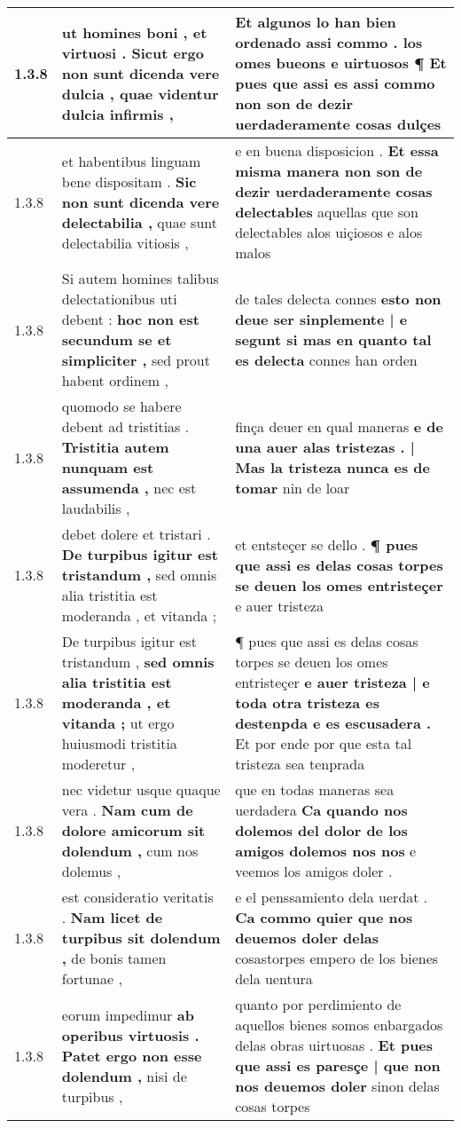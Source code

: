 \begin{tabular}{|p{1cm}|p{6.5cm}|p{6.5cm}|}
1.3.8 & ut homines boni , et virtuosi . \textbf{ Sicut ergo non sunt dicenda vere dulcia , } quae videntur dulcia infirmis , & Et algunos lo han bien ordenado assi commo . \textbf{ los omes bueons e uirtuosos ¶ Et pues que assi es assi commo non son de dezir } uerdaderamente cosas dulçes \\\hline
1.3.8 & et habentibus linguam bene dispositam . \textbf{ Sic non sunt dicenda vere delectabilia , } quae sunt delectabilia vitiosis , & e en buena disposicion . \textbf{ Et essa misma manera non son de dezir uerdaderamente cosas delectables } aquellas que son delectables alos uiçiosos e alos malos \\\hline
1.3.8 & Si autem homines talibus delectationibus uti debent : \textbf{ hoc non est secundum se et simpliciter , } sed prout habent ordinem , & de tales delecta connes \textbf{ esto non deue ser sinplemente | e segunt si mas en quanto tal es delecta } connes han orden \\\hline
1.3.8 & quomodo se habere debent ad tristitias . \textbf{ Tristitia autem nunquam est assumenda , } nec est laudabilis , & finça deuer en qual maneras \textbf{ e de una auer alas tristezas . | Mas la tristeza nunca es de tomar } nin de loar \\\hline
1.3.8 & debet dolere et tristari . \textbf{ De turpibus igitur est tristandum , } sed omnis alia tristitia est moderanda , et vitanda ; & et entsteçer se dello . \textbf{ ¶ pues que assi es delas cosas torpes se deuen los omes entristeçer } e auer tristeza \\\hline
1.3.8 & De turpibus igitur est tristandum , \textbf{ sed omnis alia tristitia est moderanda , et vitanda ; } ut ergo huiusmodi tristitia moderetur , & ¶ pues que assi es delas cosas torpes se deuen los omes entristeçer \textbf{ e auer tristeza | e toda otra tristeza es destenpda e es escusadera . } Et por ende por que esta tal tristeza sea tenprada \\\hline
1.3.8 & nec videtur usque quaque vera . \textbf{ Nam cum de dolore amicorum sit dolendum , } cum nos dolemus , & que en todas maneras sea uerdadera \textbf{ Ca quando nos dolemos del dolor de los amigos dolemos nos nos } e veemos los amigos doler . \\\hline
1.3.8 & est consideratio veritatis . \textbf{ Nam licet de turpibus sit dolendum , } de bonis tamen fortunae , & e el penssamiento dela uerdat . \textbf{ Ca commo quier que nos deuemos doler delas } cosastorpes empero de los bienes dela uentura \\\hline
1.3.8 & eorum impedimur \textbf{ ab operibus virtuosis . Patet ergo non esse dolendum , } nisi de turpibus , & quanto por perdimiento de aquellos bienes somos enbargados delas obras uirtuosas . \textbf{ Et pues que assi es paresçe | que non nos deuemos doler } sinon delas cosas torpes \\\hline

\end{tabular}
